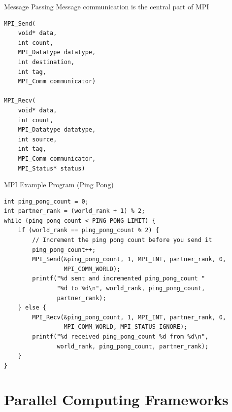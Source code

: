 \documentclass{../TexTemplate/myslide}
\begin{document}
\begin{frame}[fragile]{Message Passing}
Message communication is the central part of MPI
\begin{lstlisting}[basicstyle=\scriptsize]
MPI_Send(
    void* data,
    int count,
    MPI_Datatype datatype,
    int destination,
    int tag,
    MPI_Comm communicator)

MPI_Recv(
    void* data,
    int count,
    MPI_Datatype datatype,
    int source,
    int tag,
    MPI_Comm communicator,
    MPI_Status* status)
\end{lstlisting}
\end{frame}

\begin{frame}[fragile]{MPI Example Program (Ping Pong)}
\begin{lstlisting}
int ping_pong_count = 0;
int partner_rank = (world_rank + 1) % 2;
while (ping_pong_count < PING_PONG_LIMIT) {
    if (world_rank == ping_pong_count % 2) {
        // Increment the ping pong count before you send it
        ping_pong_count++;
        MPI_Send(&ping_pong_count, 1, MPI_INT, partner_rank, 0,
                 MPI_COMM_WORLD);
        printf("%d sent and incremented ping_pong_count "
               "%d to %d\n", world_rank, ping_pong_count,
               partner_rank);
    } else {
        MPI_Recv(&ping_pong_count, 1, MPI_INT, partner_rank, 0,
                 MPI_COMM_WORLD, MPI_STATUS_IGNORE);
        printf("%d received ping_pong_count %d from %d\n",
               world_rank, ping_pong_count, partner_rank);
    }
}
\end{lstlisting}
\end{frame}

\section{Parallel Computing Frameworks}
\begin{frame}
\sectionpage
\end{frame}
\end{document}
